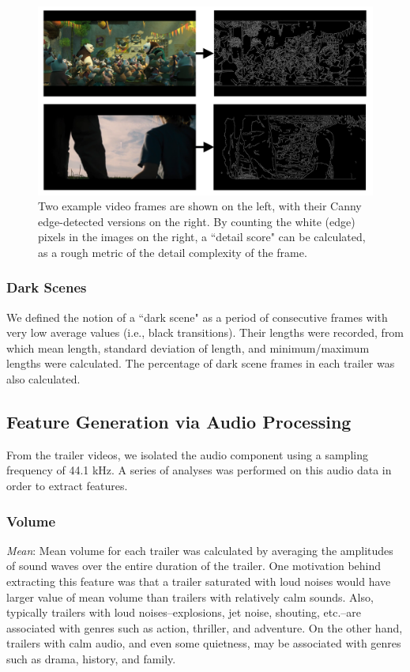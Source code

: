 \documentclass[letterpaper, 10 pt, conference]{ieeeconf}  %
\begin{document}
\begin{figure}[h]
	\centering
	\includegraphics[width=\columnwidth]{canny_combined.png}
	\caption{Two example video frames are shown on the left, with their Canny edge-detected versions on the right. By counting the white (edge) pixels in the images on the right, a ``detail score" can be calculated, as a rough metric of the detail complexity of the frame.}
	\label{f:canny_combined}
\end{figure}

\subsubsection{Dark Scenes}
We defined the notion of a ``dark scene" as a period of consecutive frames with very low average values (i.e., black transitions). Their lengths were recorded, from which mean length, standard deviation of length, and minimum/maximum lengths were calculated. The percentage of dark scene frames in each trailer was also calculated. 

\subsection{Feature Generation via Audio Processing}
From the trailer videos, we isolated the audio component using a sampling frequency of 44.1 kHz. A series of analyses was performed on this audio data in order to extract features.

\subsubsection{Volume}
\textit{Mean}: Mean volume for each trailer was calculated by averaging the amplitudes of sound waves over the entire duration of the trailer. One motivation behind extracting this feature was that a trailer saturated with loud noises would have larger value of mean volume than trailers with relatively calm sounds. Also, typically trailers with loud noises--explosions, jet noise, shouting, etc.--are associated with genres such as action, thriller, and adventure. On the other hand, trailers with calm audio, and even some quietness, may be associated with genres such as drama, history, and family. \\
\end{document}
